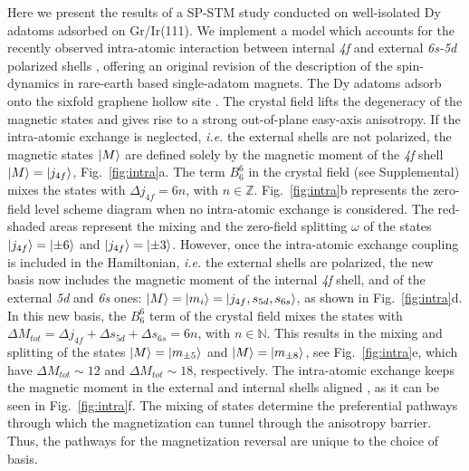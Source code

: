 \documentclass[
reprint,amsmath,amssymb,aps]{revtex4-2}
\begin{document}
Here we present the results of a SP-STM study conducted on well-isolated Dy adatoms adsorbed on Gr/Ir(111). We implement a model which accounts for the recently observed intra-atomic interaction between internal \textit{4f} and external \textit{6s-5d} polarized shells \cite{pivetta2020}, offering an original revision of the description of the spin-dynamics in rare-earth based single-adatom magnets. The Dy adatoms adsorb onto the sixfold graphene hollow site \cite{baltic2018}. The crystal field lifts the degeneracy of the magnetic states and gives rise to a strong out-of-plane easy-axis anisotropy.
If the intra-atomic exchange is neglected, \textit{i.e.} the external shells are not polarized, the magnetic states $\ket{M}$ are defined solely by the magnetic moment of the \textit{4f} shell $\ket{M}=\ket{j_{4f}}$, Fig.~\ref{fig:intra}a. The term $B_6^6$ in the crystal field (see Supplemental) mixes the states with $\Delta j_{4f}=6n$, with $n\in \mathbb{Z}$. 
Fig.~\ref{fig:intra}b represents the zero-field level scheme diagram when no intra-atomic exchange is considered. The red-shaded areas represent the mixing and the zero-field splitting $\omega$ of the states $\ket{j_{4f}}=\ket{\pm 6}$ and $\ket{j_{4f}}=\ket{\pm 3}$. However, once the intra-atomic exchange coupling is included in the Hamiltonian, \textit{i.e.} the external shells are polarized, the new basis now includes the magnetic moment of the internal \textit{4f} shell, and of the external \textit{5d} and \textit{6s} ones: $\ket{M}=\ket{m_i}=\ket{j_{4f},s_{5d},s_{6s}}$, as shown in Fig.~\ref{fig:intra}d.
In this new basis, the $B_6^6$ term of the crystal field mixes the states with $\Delta M_{tot}=\Delta j_{4f} + \Delta s_{5d} + \Delta s_{6s}=6n$, with $n\in \mathbb{N}$. This results in the mixing and splitting of the states $\ket{M}=\ket{m_{\pm 5}}$ and $\ket{M}=\ket{m_{\pm 8}}$, see Fig.~\ref{fig:intra}e, which have $\Delta M_{tot}\sim 12$ and $\Delta M_{tot}\sim 18$, respectively. The intra-atomic exchange keeps the magnetic moment in the external and internal shells aligned \cite{pivetta2020}, as it can be seen in Fig.~\ref{fig:intra}f. The mixing of states determine the preferential pathways through which the magnetization can tunnel through the anisotropy barrier. Thus, the pathways for the magnetization reversal are unique to the choice of basis. 
\end{document}
